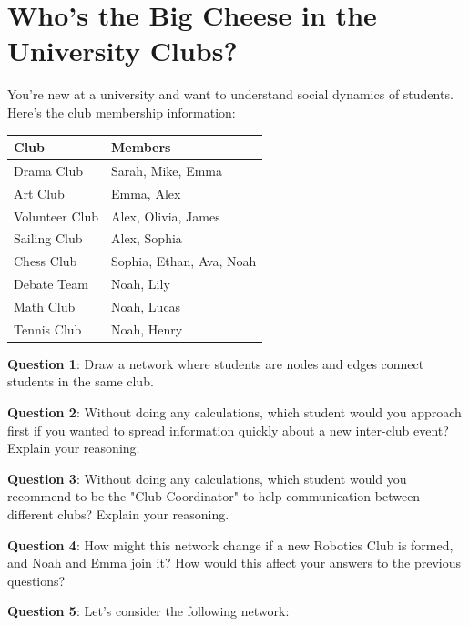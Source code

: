 \documentclass[a4paper, 14pt]{extarticle}
\begin{document}
\section*{Who's the Big Cheese in the University Clubs?}

You're new at a university and want to understand social dynamics of students. Here's the club membership information:

\begin{center}
\begin{tabular}{|l|l|}
    \hline
    \textbf{Club} & \textbf{Members} \\
    \hline
    Drama Club & Sarah, Mike, Emma \\
    Art Club & Emma, Alex \\
    Volunteer Club & Alex, Olivia, James \\
    Sailing Club & Alex, Sophia \\
    Chess Club & Sophia, Ethan, Ava, Noah \\
    Debate Team & Noah, Lily \\
    Math Club & Noah, Lucas \\
    Tennis Club & Noah, Henry \\
    \hline
\end{tabular}
\end{center}

{\bf Question 1}:
Draw a network where students are nodes and edges connect students in the same club.

\clearpage

{\bf Question 2}:
Without doing any calculations, which student would you approach first if you wanted to spread information quickly about a new inter-club event? Explain your reasoning.

\vspace{8em}
{\bf Question 3}:
Without doing any calculations, which student would you recommend to be the "Club Coordinator" to help communication between different clubs? Explain your reasoning.

\vspace{8em}
{\bf Question 4}:
How might this network change if a new Robotics Club is formed, and Noah and Emma join it? How would this affect your answers to the previous questions?

\clearpage

{\bf Question 5}: Let's consider the following network:
\end{document}
